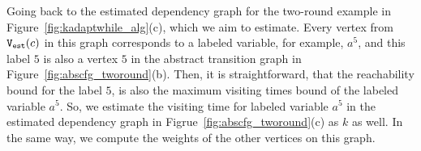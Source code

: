 Going back to the
estimated dependency graph for the two-round example in
Figure~\ref{fig:kadaptwhile_alg}(c), which we aim to estimate.
%
Every vertex from $\mathtt{{V_{est}}}(c)$ in this graph corresponds to a labeled variable, for example, $a^5$,
and this label $5$ is also a vertex $5$ in the abstract transition graph in Figure~\ref{fig:abscfg_tworound}(b).
%
Then, it is straightforward, 
that the reachability bound for the label $5$, 
is also the maximum visiting times bound of the labeled variable $a^5$.
So, we estimate the visiting time for labeled variable $a^5$ in the estimated dependency graph in Figrue~\ref{fig:abscfg_tworound}(c) as $k$ as well.
%
In the same way, we compute the weights of the other vertices on this graph.
